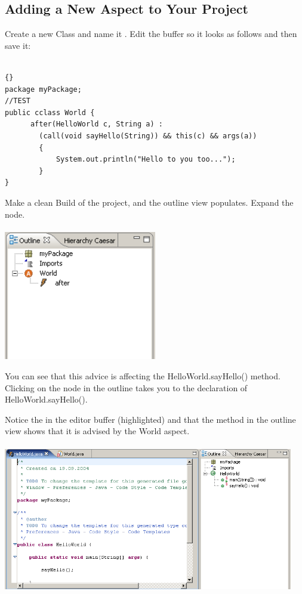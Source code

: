 \subsection{Adding a New Aspect to Your Project}
Create a new Class and name it . Edit the buffer so it looks as follows and then save it:\\\\
\begin{lstlisting}[basicstyle=\small\it,caption=Parser endElement Event,label=lst:endelement,name=listing:endelement,frame=none]{}
package myPackage;
//TEST
public cclass World { 	
      after(HelloWorld c, String a) :
      	(call(void sayHello(String)) && this(c) && args(a))
		{
            System.out.println("Hello to you too...");
		}
}\end{lstlisting}

Make a clean Build of the project, and the outline view populates. Expand the  node.\\\\
\includegraphics[width=0.5\textwidth]{images/aspect2.png}\newpage

You can see that this advice is affecting the HelloWorld.sayHello() method. Clicking on the  node in the outline takes you to the declaration of HelloWorld.sayHello().

Notice the  in the editor buffer (highlighted) and that the  method in the outline view shows that it is advised by the World aspect.\\\\
\includegraphics[width=0.95\textwidth]{images/aspect3.png}\\\\

